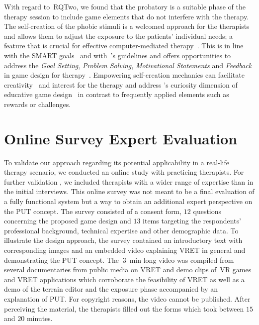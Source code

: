With regard to~\acl{RQTwo}, we found that the probatory is a suitable phase of the therapy session to include game elements that do not interfere with the therapy. The self-creation of the phobic stimuli is a welcomed approach for the therapists and allows them to adjust the exposure to the patients' individual needs; a feature that is crucial for effective computer-mediated therapy~\cite{herrlich2017}.
This is in line with the SMART goals~\cite{fenn2013} and with~\citeauthor{thompson2010}'s guidelines and offers opportunities to address the \textit{Goal Setting}, \textit{Problem Solving}, \textit{Motivational Statements} and \textit{Feedback} in game design for therapy~\cite{thompson2010}.
Empowering self-creation mechanics can facilitate creativity~\cite{wang2014,zhang2008} and interest for the therapy and address \citeauthor{malone1980}'s curiosity dimension of educative game design~\cite{malone1980} in contrast to frequently applied elements such as rewards or challenges.


\section{Online Survey Expert Evaluation}
\label{sec:online_survey}
To validate our approach regarding its potential applicability in a real-life therapy scenario, we conducted an online study with practicing therapists. For further validation%
, we included therapists with a wider range of expertise than in the initial interviews. This online survey was not meant to be a final evaluation of a fully functional system but a way to obtain an additional expert perspective on the \ac{PUT} concept.
The survey consisted of a consent form, $12$ questions concerning the proposed game design and $13$ items targeting the respondents' professional background, technical expertise and other demographic data. To illustrate the design approach, the survey contained an introductory text with corresponding images and an embedded video explaining \ac{VRET} in general and demonstrating the \ac{PUT} concept. The $~3$~\si{\minute} long video was compiled from several documentaries from public media on \ac{VRET} and demo clips of~\ac{VR} games and \ac{VRET} applications which corroborate the feasibility of \ac{VRET} as well as a demo of the terrain editor and the exposure phase accompanied by an explanation of \ac{PUT}. For copyright reasons, the video cannot be published.
After perceiving the material, the therapists filled out the forms which took between $15$ and $20$ minutes. 

